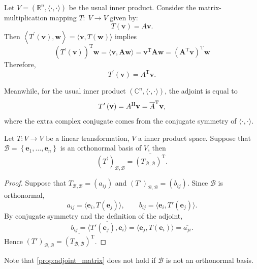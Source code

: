 \begin{example} Let \(V = ({\mathbb{R}}^{n},\langle  \cdot , \cdot  \rangle)\) be the usual inner product. Consider the matrix-multiplication mapping \(T : \;V \rightarrow  V\) given by:
\[
T\left( \mathbf{v}\right)  = A\mathbf{v}.
\]
Then \(\left\langle  {{T}^{\prime }\left( \mathbf{v}\right),\mathbf{w}}\right\rangle   = \langle \mathbf{v},T\left( \mathbf{w}\right) \rangle\) implies
\[
{\left( {T}^{\prime }\left( \mathbf{v}\right) \right) }^{\mathrm{T}}\mathbf{w} = \langle \mathbf{v},\mathbf{A}\mathbf{w}\rangle
= {\mathbf{v}}^{\mathrm{T}}\mathbf{A}\mathbf{w}
= {\left( {\mathbf{A}}^{\mathrm{T}}\mathbf{v}\right) }^{\mathrm{T}}\mathbf{w}
\]
Therefore, 
\[{T}^{\prime }\left( \mathbf{v}\right)  = {A}^{\mathrm{T}}\mathbf{v}.\]

Meanwhile, for the usual inner product \(({\mathbb{C}}^{n},\langle  \cdot , \cdot  \rangle)\), the adjoint is equal to
\[{T}^{\prime }\left( \mathbf{v}\right)  = {A}^{\mathrm{H}}\mathbf{v} = \overline{A}^{\mathrm{T}}{\bf v},\]
where the extra complex conjugate comes from the conjugate symmetry of $\langle  \cdot , \cdot  \rangle$.
\end{example}

\begin{proposition} \label{prop:adjoint_matrix} Let \(T : V \rightarrow  V\) be a linear transformation, \(V\) a inner product space. Suppose that \(\mathcal{B} = \left\{  {{\mathbf{e}}_{1},\ldots,{\mathbf{e}}_{n}}\right\}\) is an orthonormal basis of \(V\), then
\[
{\left( {T}^{\prime }\right) }_{\mathcal{B},\mathcal{B}} = \overline{{\left( T_{\mathcal{B},\mathcal{B}}\right) }^{\mathrm{T}}}.
\]
\end{proposition}

\begin{proof}
Suppose that $T_{\mathcal{B},\mathcal{B}}=(a_{ij})$ and $(T')_{\mathcal{B},\mathcal{B}}=(b_{ij})$. Since $\mathcal B$ is orthonormal,
\[
a_{ij}=\langle \mathbf e_i,T(\mathbf e_j)\rangle,
\qquad
b_{ij}=\langle \mathbf e_i,T'(\mathbf e_j)\rangle.
\]
By conjugate symmetry and the definition of the adjoint,
\[
b_{ij}
=\overline{\langle T'(\mathbf e_j),\mathbf e_i\rangle}
=\overline{\langle \mathbf e_j,T(\mathbf e_i)\rangle}
=\overline{a_{ji}}.
\]
Hence $(T')_{\mathcal B,\mathcal B}=\overline{(T_{\mathcal B,\mathcal B})^{\mathrm T}}$.
\end{proof}

Note that \autoref{prop:adjoint_matrix} does not hold if \(\mathcal{B}\) is not an orthonormal basis.


